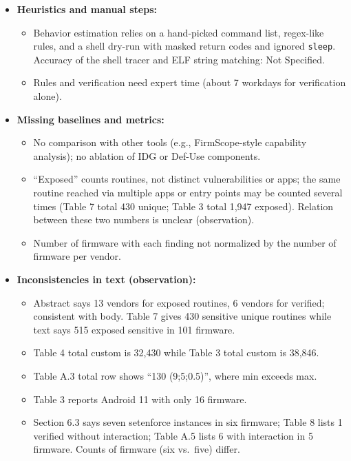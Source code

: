 \documentclass[11pt,a4paper]{article}
\begin{document}
\begin{enumerate}
\begin{itemize}[leftmargin=*, itemsep=1pt, topsep=2pt]
\begin{itemize}[itemsep=0pt]
            \item Only stock firmware; carrier variants not covered.
        \end{itemize}
        \item \textbf{Heuristics and manual steps:}
        \begin{itemize}[itemsep=0pt]
            \item Behavior estimation relies on a hand-picked command list, regex-like rules, and a shell dry-run with masked return codes and ignored \texttt{sleep}. Accuracy of the shell tracer and ELF string matching: Not Specified.
            \item Rules and verification need expert time (about 7 workdays for verification alone).
        \end{itemize}
        \item \textbf{Missing baselines and metrics:}
        \begin{itemize}[itemsep=0pt]
            \item No comparison with other tools (e.g., FirmScope-style capability analysis); no ablation of IDG or Def-Use components.
            \item ``Exposed'' counts routines, not distinct vulnerabilities or apps; the same routine reached via multiple apps or entry points may be counted several times (Table 7 total 430 unique; Table 3 total 1,947 exposed). Relation between these two numbers is unclear (observation).
            \item Number of firmware with each finding not normalized by the number of firmware per vendor.
        \end{itemize}
        \item \textbf{Inconsistencies in text (observation):}
        \begin{itemize}[itemsep=0pt]
            \item Abstract says 13 vendors for exposed routines, 6 vendors for verified; consistent with body. Table 7 gives 430 sensitive unique routines while text says 515 exposed sensitive in 101 firmware.
            \item Table 4 total custom is 32,430 while Table 3 total custom is 38,846.
            \item Table A.3 total row shows ``130 (9;5;0.5)'', where min exceeds max.
            \item Table 3 reports Android 11 with only 16 firmware.
            \item Section 6.3 says seven setenforce instances in six firmware; Table 8 lists 1 verified without interaction; Table A.5 lists 6 with interaction in 5 firmware. Counts of firmware (six vs.\ five) differ.

\end{itemize}
\end{itemize}
\end{enumerate}
\end{document}
